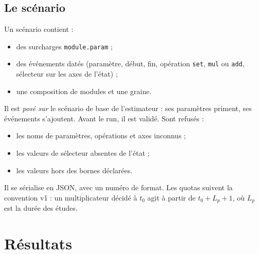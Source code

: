 \subsection{Le scénario}
Un scénario contient :
\begin{itemize}
  \item des surcharges \texttt{module.param} ;
  \item des événements datés (paramètre, début, fin, opération \texttt{set}, \texttt{mul} ou
        \texttt{add}, sélecteur sur les axes de l'état) ;
  \item une composition de modules et une graine.
\end{itemize}
Il est \emph{posé sur} le scénario de base de l'estimateur : ses paramètres priment, ses événements
s'ajoutent. Avant le run, il est validé. Sont refusés :
\begin{itemize}
  \item les noms de paramètres, opérations et axes inconnus ;
  \item les valeurs de sélecteur absentes de l'état ;
  \item les valeurs hors des bornes déclarées.
\end{itemize}
Il se sérialise en JSON, avec un numéro de format. Les quotas suivent la convention v1 : un
multiplicateur décidé à $t_0$ agit à partir de $t_0 + L_p + 1$, où $L_p$ est la durée des études.

\section{Résultats}\label{a0-sec:resultats}


